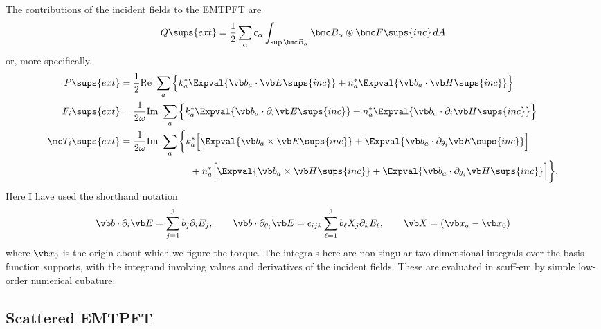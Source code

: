 The contributions of the incident fields to the EMTPFT are
$$ Q\sups{ext}=
   \frac{1}{2}\sum_{\alpha} c_\alpha
   \int_{\sup \bmc B_\alpha} \bmc B_\alpha \circledast \bmc F\sups{inc} \, dA
$$
or, more specifically,
\begin{align*}
 P\sups{ext} &=
 \frac{1}{2}\text{Re }\sum_{a}
  \Big\{  k_a^* \Expval{\vb b_a \cdot \vb E\sups{inc}}
         +n_a^* \Expval{\vb b_a \cdot \vb H\sups{inc}}
  \Big\}
\\
 F_i\sups{ext} &=
 \frac{1}{2\omega}\text{Im }\sum_{a}
  \Big\{  k_a^* \Expval{\vb b_a \cdot \partial_i\vb E\sups{inc}}
         +n_a^* \Expval{\vb b_a \cdot \partial_i \vb H\sups{inc}}
  \Big\}
\\
 \mc T_i\sups{ext} &=
 \frac{1}{2\omega}\text{Im }\sum_{a}
  \bigg\{  k_a^*\Big[ \Expval{\vb b_a \times \vb E\sups{inc}}
                     +\Expval{\vb b_a \cdot \partial_{\theta_i}\vb E\sups{inc}}
               \Big]
\\
&\hspace{1in}
         + n_a^*\Big[ \Expval{\vb b_a \times \vb H\sups{inc}}
                     +\Expval{\vb b_a \cdot \partial_{\theta_i}\vb H\sups{inc}}
               \Big]
  \bigg\}.
\end{align*}
Here I have used the shorthand notation 
$$ \vb b \cdot \partial_i \vb E = \sum_{j=1}^3 b_j \partial_i E_j, 
   \qquad 
   \vb b \cdot \partial_{\theta_i}\vb E = 
   \epsilon_{ijk} \sum_{\ell=1}^3 b_\ell X_j \partial_k E_\ell,
   \qquad \vb X = (\vb x_a - \vb x_0)
$$
where $\vb x_0$ is the origin about which we figure the torque.
The integrals here are non-singular two-dimensional integrals over
the basis-function supports, with the integrand involving values 
and derivatives of the incident fields. These are evaluated 
in {\sc scuff-em} by simple low-order numerical cubature.

\subsection{Scattered EMTPFT}

